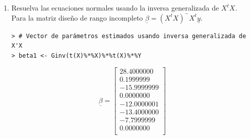 \documentclass[10pt,a4paper]{report}
\begin{document}
\begin{enumerate}
$$X^tX\underline{\beta} = X^t\underline{y}$$
\begin{eqnarray*}
\begin{bmatrix}
8 & 3 & 2 & 3 & 2 & 1 & 3 & 2 \\
3 & 3 & 0 & 0 & 1 & 0 & 1 & 1 \\
2 & 0 & 2 & 0 & 0 & 0 & 1 & 1 \\
3 & 0 & 0 & 3 & 1 & 1 & 1 & 0 \\
2 & 1 & 0 & 1 & 2 & 0 & 0 & 0 \\
1 & 0 & 0 & 1 & 0 & 1 & 0 & 0 \\
3 & 1 & 1 & 1 & 0 & 0 & 3 & 0 \\
2 & 1 & 1 & 0 & 0 & 0 & 0 & 2
\end{bmatrix}\begin{bmatrix}
\mu \\ \alpha_1 \\ \alpha_2 \\ \alpha_3 \\ 
\beta_1 \\ \beta_2 \\ \beta_3 \\ \beta_4 
\end{bmatrix} &=& \begin{bmatrix}
135 \\ 66 \\ 17 \\ 52 \\ 33 \\ 15 \\ 46 \\ 41
\end{bmatrix}
\end{eqnarray*}

\item[c)] Resuelva las ecuaciones normales usando la inversa generalizada de ${X}^{t}X$.\\

Para la matriz diseño de rango incompleto  $\underline{\beta} =({X}^{t}X)^-X^{t}\underline{y}$.
\begin{verbatim}
> # Vector de parámetros estimados usando inversa generalizada de X'X
> beta1 <- Ginv(t(X)%*%X)%*%t(X)%*%Y
\end{verbatim}
\begin{equation*}
\underline{\beta}=\begin{bmatrix}
 28.4000000\\
  0.1999999\\
-15.9999999\\
 0.0000000\\
 -12.0000001\\
-13.4000000\\
 -7.7999999\\
 0.0000000\\
\end{bmatrix}
\end{equation*}


\end{enumerate}
\end{document}
